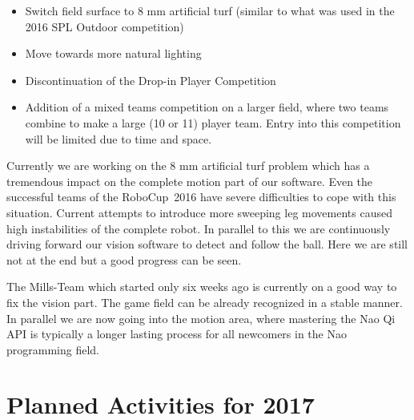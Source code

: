 \documentclass[11pt]{article}
\begin{document}
\begin{itemize}
	\item Switch field surface to 8 mm artificial turf (similar to what was used in the 2016 SPL Outdoor competition)
	\item Move towards more natural lighting
	\item Discontinuation of the Drop-in Player Competition
	\item Addition of a mixed teams competition on a larger field, where two teams combine to make a large (10 or 11) player team.  Entry into this competition will be limited due to time and space.
\end{itemize}

Currently we are working on the 8 mm artificial turf problem which has a tremendous impact on the complete motion part of our software. Even the successful teams of the RoboCup~2016 have severe difficulties to cope with this situation. Current attempts to introduce more sweeping leg movements caused high instabilities of the complete robot. In parallel to this we are continuously driving forward our vision software to detect and follow the ball. Here we are still not at the end but a good progress can be seen.

The Mills-Team which started only six weeks ago is currently on a good way to fix the vision part. The game field can be already recognized in a stable manner. In parallel we are now going into the motion area, where mastering the Nao Qi API is typically a longer lasting process for all newcomers in the Nao programming field. 
\section{Planned Activities for 2017}
\end{document}
